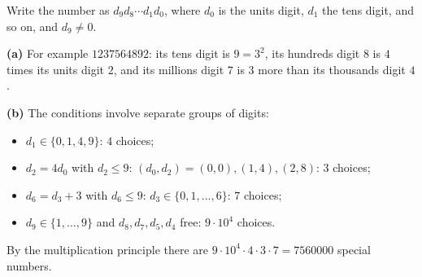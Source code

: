 Write the number as $d_9d_8\cdots d_1d_0$, where $d_0$ is the units digit, $d_1$ the tens digit, and so on, and $d_9\ne0$.

\textbf{(a)} For example $1237564892$: its tens digit is $9=3^2$, its hundreds digit $8$ is $4$ times its units digit $2$, and its millions digit $7$ is $3$ more than its thousands digit $4$.

\textbf{(b)} The conditions involve separate groups of digits:
\begin{itemize}
\item $d_1\in\{0,1,4,9\}$: $4$ choices;
\item $d_2=4d_0$ with $d_2\le9$: $(d_0,d_2)=(0,0),(1,4),(2,8)$: $3$ choices;
\item $d_6=d_3+3$ with $d_6\le9$: $d_3\in\{0,1,\dots,6\}$: $7$ choices;
\item $d_9\in\{1,\dots,9\}$ and $d_8,d_7,d_5,d_4$ free: $9\cdot10^4$ choices.
\end{itemize}
By the multiplication principle there are $9\cdot10^4\cdot4\cdot3\cdot7=\boxed{7560000}$ special numbers.
